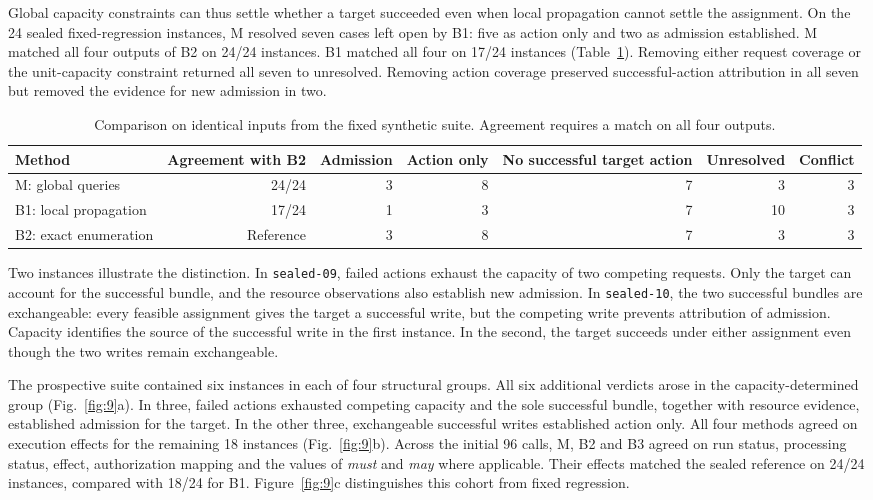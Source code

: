 Global capacity constraints can thus settle whether a target succeeded even when local propagation cannot settle the assignment. On the 24 sealed fixed-regression instances, M resolved seven cases left open by B1: five as action only and two as admission established. M matched all four outputs of B2 on 24/24 instances. B1 matched all four on 17/24 instances (Table~\ref{tab:7}). Removing either request coverage or the unit-capacity constraint returned all seven to unresolved. Removing action coverage preserved successful-action attribution in all seven but removed the evidence for new admission in two.

\begin{table}[t]\centering
\caption{Comparison on identical inputs from the fixed synthetic suite. Agreement requires a match on all four outputs.}\label{tab:7}
\small\begin{tabularx}{\textwidth}{@{}Xrrrrrr@{}}\toprule
Method & Agreement with B2 & Admission & Action only & No successful target action & Unresolved & Conflict\\\midrule
M: global queries & 24/24 & 3 & 8 & 7 & 3 & 3\\
B1: local propagation & 17/24 & 1 & 3 & 7 & 10 & 3\\
B2: exact enumeration & Reference & 3 & 8 & 7 & 3 & 3\\\bottomrule
\end{tabularx}\end{table}

Two instances illustrate the distinction. In \texttt{sealed-09}, failed actions exhaust the capacity of two competing requests. Only the target can account for the successful bundle, and the resource observations also establish new admission. In \texttt{sealed-10}, the two successful bundles are exchangeable: every feasible assignment gives the target a successful write, but the competing write prevents attribution of admission. Capacity identifies the source of the successful write in the first instance. In the second, the target succeeds under either assignment even though the two writes remain exchangeable.

The prospective suite contained six instances in each of four structural groups. All six additional verdicts arose in the capacity-determined group (Fig.~\ref{fig:9}a). In three, failed actions exhausted competing capacity and the sole successful bundle, together with resource evidence, established admission for the target. In the other three, exchangeable successful writes established action only. All four methods agreed on execution effects for the remaining 18 instances (Fig.~\ref{fig:9}b). Across the initial 96 calls, M, B2 and B3 agreed on run status, processing status, effect, authorization mapping and the values of \textit{must} and \textit{may} where applicable. Their effects matched the sealed reference on 24/24 instances, compared with 18/24 for B1. Figure~\ref{fig:9}c distinguishes this cohort from fixed regression.

